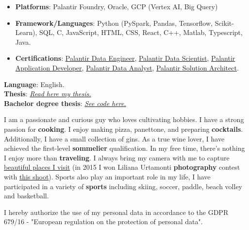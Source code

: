 \begin{itemize}
  \item \textbf{Platforms}: Palantir Foundry, Oracle, GCP (Vertex AI, Big Query)
  \item \textbf{Framework/Languages}: Python (PySpark, Pandas, Tensorflow, Scikit-Learn), SQL, C, JavaScript, HTML, CSS, React, C++, Matlab, Typescript, Java.
  \item \textbf{Certifications}: \href{https://verify.skilljar.com/c/w9z3dnmtv68y}{Palantir Data Engineer}, \href{https://verify.skilljar.com/c/gx72n6ke6ybo}{Palantir Data Scientist}, \href{https://verify.skilljar.com/c/42kbrbf6i9cq}{Palantir Application Developer}, \href{https://verify.skilljar.com/c/8po7zjfgt25o}{Palantir Data Analyst}, \href{https://verify.skilljar.com/c/yy4f9p52gbfr}{Palantir Solution Architect}.

  
\end{itemize}


\textbf{Language}: English.\\
\textbf{Thesis}: \textit{\href{https://www.politesi.polimi.it/handle/10589/204539}{Read here my thesis.}}\\
\textbf{Bachelor degree thesis}: \textit{\href{https://github.com/lentinip/ing-sw-2019-Lentini-Marazzi-Marini}{See code here.}}






I am a passionate and curious guy who loves cultivating hobbies. I have a strong passion for \textbf{cooking}. I enjoy making pizza, panettone, and preparing \textbf{cocktails}. Additionally, I have a small collection of gins. As a true wine lover, I have achieved the first-level \textbf{sommelier} qualification. In my free time, there's nothing I enjoy more than \textbf{traveling}. I always bring my camera with me to capture \href{https://mmarini.it/gallery}{beautiful places I visit} (in 2015 I won Liliana Urtamonti \textbf{photography} contest with \href{https://www.instagram.com/p/1Ql0DrivyoekSE2An1JIdCRMaRkLcDW62WAho0/}{this shoot}). Sports also play an important role in my life, I have participated in a variety of \textbf{sports} including skiing, soccer, paddle, beach volley and basketball.

\divider

\footnotesize{I hereby authorize the use of my personal data in accordance to the GDPR 679/16 - "European regulation on the protection of personal data".}

